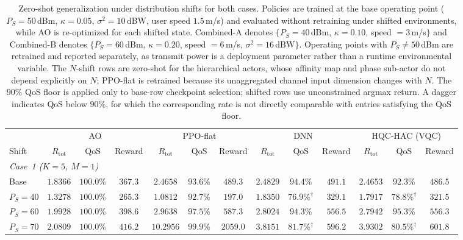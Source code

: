 \documentclass[12pt,onecolumn]{IEEEtran}
\begin{document}
\begin{table}[!t]
\centering
\caption{Zero-shot generalization under distribution shifts for both cases.
Policies are trained at the base operating point
($P_S=50$\,dBm, $\kappa=0.05$, $\sigma^2=10$\,dBW, user speed $1.5$\,m/s)
and evaluated without retraining under shifted environments, while AO is
re-optimized for each shifted state.
Combined-A denotes $\{P_S=40$\,dBm, $\kappa=0.10$, speed $=3$\,m/s$\}$ and
Combined-B denotes $\{P_S=60$\,dBm, $\kappa=0.20$, speed $=6$\,m/s,
$\sigma^2=16$\,dBW$\}$.
Operating points with $P_S\neq50$\,dBm are retrained and reported separately,
as transmit power is a deployment parameter rather than a runtime
environmental variable.
The $N$-shift rows are zero-shot for the hierarchical actors, whose
affinity map and phase sub-actor do not depend explicitly on $N$; PPO-flat
is retrained because its unaggregated channel input dimension changes with
$N$.
The $90\%$ QoS floor is applied only to base-row checkpoint selection;
shifted rows use unconstrained argmax return.
A dagger indicates QoS below $90\%$, for which the corresponding rate is not directly comparable with entries satisfying the QoS floor.}
\label{tab:abl_genshift}
\setlength{\tabcolsep}{3pt}
\scriptsize
\begin{tabular}{lcccccccccccc}
\toprule
 & \multicolumn{3}{c}{AO} & \multicolumn{3}{c}{PPO-flat} & \multicolumn{3}{c}{DNN} & \multicolumn{3}{c}{HQC-HAC (VQC)} \\
\cmidrule(lr){2-4}\cmidrule(lr){5-7}\cmidrule(lr){8-10}\cmidrule(lr){11-13}
Shift & $R_{\mathrm{tot}}$ & QoS & Reward & $R_{\mathrm{tot}}$ & QoS & Reward & $R_{\mathrm{tot}}$ & QoS & Reward & $R_{\mathrm{tot}}$ & QoS & Reward \\
\midrule
\multicolumn{13}{l}{\emph{Case~1 ($K=5$, $M=1$)}} \\
Base & $1.8366$ & $100.0$\% & $367.3$ & $2.4658$ & $93.6$\% & $489.3$ & $2.4829$ & $94.4$\% & $\mathbf{491.1}$ & $2.4653$ & $92.3$\% & $486.5$ \\
\cmidrule(lr){1-13}
$P_S=40$ & $1.3278$ & $100.0$\% & $265.3$ & $1.0812$ & $92.7$\% & $197.0$ & $1.8350$ & $76.9$\%$^{\dagger}$ & $\mathbf{329.1}$ & $1.7917$ & $78.8$\%$^{\dagger}$ & $321.5$ \\
$P_S=60$ & $1.9928$ & $100.0$\% & $398.6$ & $2.9638$ & $97.5$\% & $\mathbf{587.3}$ & $2.8024$ & $94.3$\% & $556.5$ & $2.7942$ & $95.3$\% & $556.3$ \\
$P_S=70$ & $2.0809$ & $100.0$\% & $416.2$ & $10.2956$ & $99.9$\% & $\mathbf{2059.0}$ & $3.8151$ & $81.7$\%$^{\dagger}$ & $596.2$ & $3.9302$ & $80.5$\%$^{\dagger}$ & $601.8$ \\

\end{tabular}
\end{table}
\end{document}
